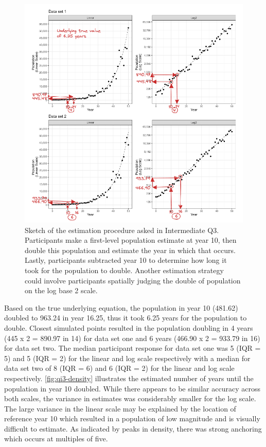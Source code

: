 \documentclass[print]{nuthesis}
\begin{document}
\begin{figure}[tbp]

{\centering \includegraphics[width=1\linewidth,]{images/03-estimation/qi3-sketch} 

}

\caption[Intermediate Q3 sketch]{Sketch of the estimation procedure asked in Intermediate Q3. Participants make a first-level population estimate at year 10, then double this population and estimate the year in which that occurs. Lastly, participants subtracted year 10 to determine how long it took for the population to double. Another estimation strategy could involve participants spatially judging the double of population on the log base 2 scale.}\label{fig:qi3-sketch}
\end{figure}

Based on the true underlying equation, the population in year 10 (481.62) doubled to 963.24 in year 16.25, thus it took 6.25 years for the population to double.
Closest simulated points resulted in the population doubling in 4 years (445 x 2 = 890.97 in 14) for data set one and 6 years (466.90 x 2 = 933.79 in 16) for data set two.
The median participant response for data set one was 5 (IQR = 5) and 5 (IQR = 2) for the linear and log scale respectively with a median for data set two of 8 (IQR = 6) and 6 (IQR = 2) for the linear and log scale respectively.
\cref{fig:qi3-density} illustrates the estimated number of years until the population in year 10 doubled.
While there appears to be similar accuracy across both scales, the variance in estimates was considerably smaller for the log scale.
The large variance in the linear scale may be explained by the location of reference year 10 which resulted in a population of low magnitude and is visually difficult to estimate.
As indicated by peaks in density, there was strong anchoring which occurs at multiples of five.
\end{document}
